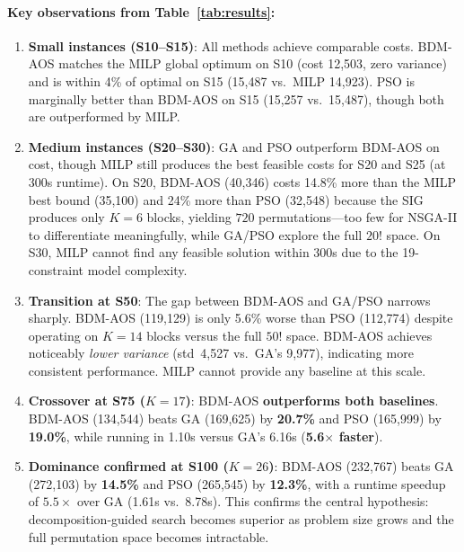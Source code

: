 \paragraph{Key observations from Table~\ref{tab:results}:}
\begin{enumerate}
    \item \textbf{Small instances (S10--S15)}: All methods achieve comparable costs.
    BDM-AOS matches the MILP global optimum on S10 (cost 12,503, zero variance) and is within 4\% of optimal on S15 (15,487 vs.\ MILP 14,923).
    PSO is marginally better than BDM-AOS on S15 (15,257 vs.\ 15,487), though both are outperformed by MILP.

    \item \textbf{Medium instances (S20--S30)}: GA and PSO outperform BDM-AOS on cost, though MILP still produces the best feasible costs for S20 and S25 (at 300s runtime).
    On S20, BDM-AOS (40,346) costs 14.8\% more than the MILP best bound (35,100) and 24\% more than PSO (32,548) because the SIG produces only $K{=}6$ blocks, yielding $720$ permutations---too few for NSGA-II to differentiate meaningfully, while GA/PSO explore the full $20!$ space.
    On S30, MILP cannot find any feasible solution within 300s due to the 19-constraint model complexity.

    \item \textbf{Transition at S50}: The gap between BDM-AOS and GA/PSO narrows sharply.
    BDM-AOS (119,129) is only 5.6\% worse than PSO (112,774) despite operating on $K{=}14$ blocks versus the full $50!$ space.
    BDM-AOS achieves noticeably \emph{lower variance} (std~4,527 vs.\ GA's 9,977), indicating more consistent performance.
    MILP cannot provide any baseline at this scale.

    \item \textbf{Crossover at S75 ($K{=}17$)}: BDM-AOS \textbf{outperforms both baselines}.
    BDM-AOS (134,544) beats GA (169,625) by \textbf{20.7\%} and PSO (165,999) by \textbf{19.0\%}, while running in 1.10s versus GA's 6.16s (\textbf{5.6$\times$ faster}).

    \item \textbf{Dominance confirmed at S100 ($K{=}26$)}: BDM-AOS (232,767) beats GA (272,103) by \textbf{14.5\%} and PSO (265,545) by \textbf{12.3\%}, with a runtime speedup of $\mathbf{5.5\times}$ over GA (1.61s vs.\ 8.78s).
    This confirms the central hypothesis: decomposition-guided search becomes superior as problem size grows and the full permutation space becomes intractable.
\end{enumerate}


